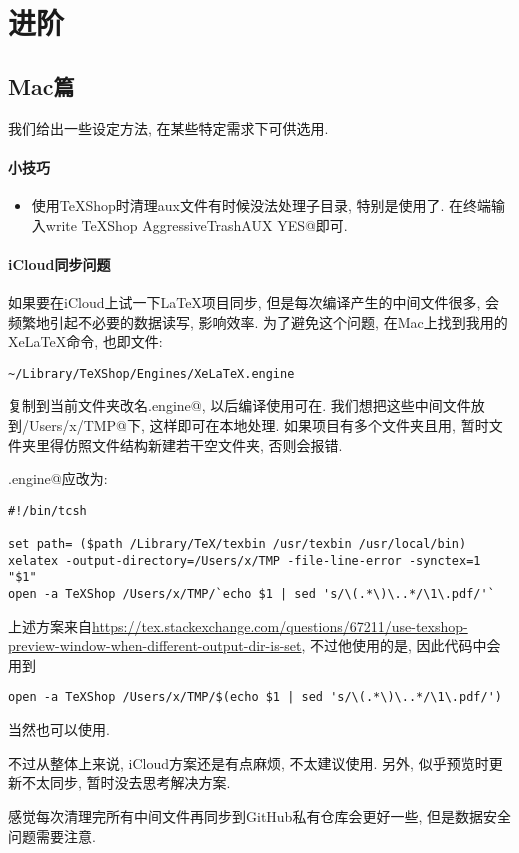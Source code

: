 \chapter{进阶}

\section{Mac篇}

我们给出一些设定方法, 在某些特定需求下可供选用.

\subsubsection{小技巧}

\begin{itemize}
    \item   使用TeXShop时清理aux文件有时候没法处理子目录,
    特别是使用了. 在终端输入\verb@defaults write TeXShop AggressiveTrashAUX YES@即可.
\end{itemize}

\subsubsection{iCloud同步问题}

如果要在iCloud上试一下\LaTeX{}项目同步, 但是每次编译产生的中间文件很多, 会频繁地引起不必要的数据读写, 影响效率.
为了避免这个问题, 在Mac上找到我用的XeLaTeX命令, 也即文件:
\begin{Verbatim}
~/Library/TeXShop/Engines/XeLaTeX.engine
\end{Verbatim}
复制到当前文件夹改名\verb@CLOUD.engine@, 以后编译使用可在.
我们想把这些中间文件放到\verb@/Users/x/TMP@下, 这样即可在本地处理. 如果项目有多个文件夹且用,
暂时文件夹里得仿照文件结构新建若干空文件夹, 否则会报错.

\verb@CLOUD.engine@应改为:
\begin{Verbatim}
#!/bin/tcsh

set path= ($path /Library/TeX/texbin /usr/texbin /usr/local/bin)
xelatex -output-directory=/Users/x/TMP -file-line-error -synctex=1 "$1"
open -a TeXShop /Users/x/TMP/`echo $1 | sed 's/\(.*\)\..*/\1\.pdf/'`
\end{Verbatim}
上述方案来自\url{https://tex.stackexchange.com/questions/67211/use-texshop-preview-window-when-different-output-dir-is-set},
不过他使用的是\verb@tcsh@, 因此代码中会用到
\begin{Verbatim}
open -a TeXShop /Users/x/TMP/$(echo $1 | sed 's/\(.*\)\..*/\1\.pdf/')
\end{Verbatim}
当然也可以使用.

不过从整体上来说, iCloud方案还是有点麻烦, 不太建议使用. 另外, 似乎预览时更新不太同步, 暂时没去思考解决方案.

感觉每次清理完所有中间文件再同步到GitHub私有仓库会更好一些, 但是数据安全问题需要注意. 
